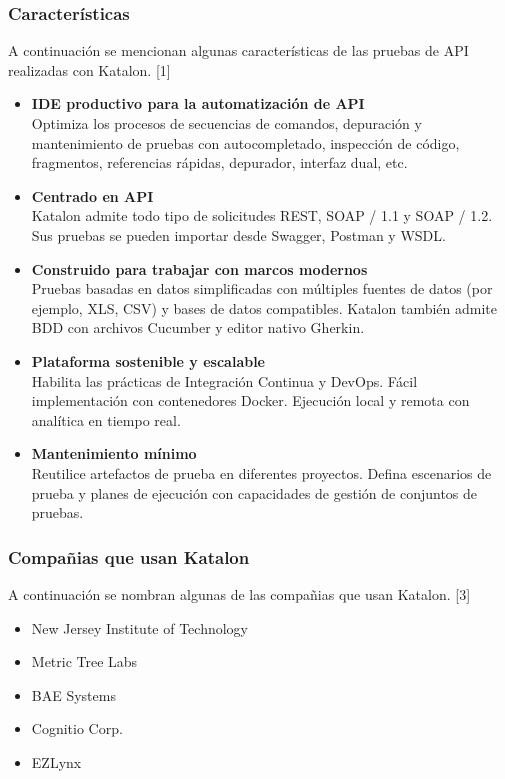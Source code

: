 \documentclass[twoside,twocolumn]{article}
\begin{document}
\subsubsection{Características}

A continuación se mencionan algunas características de las pruebas de API realizadas con Katalon. [1]

\begin{itemize}
  \item \textbf{IDE productivo para la automatización de API} \\
  Optimiza los procesos de secuencias de comandos, depuración y mantenimiento de pruebas con autocompletado, inspección de código, fragmentos, referencias rápidas, depurador, interfaz dual, etc.  
  \item \textbf{Centrado en API} \\
  Katalon admite todo tipo de solicitudes REST, SOAP / 1.1 y SOAP / 1.2. Sus pruebas se pueden importar desde Swagger, Postman y WSDL.
  \item \textbf{Construido para trabajar con marcos modernos} \\
  Pruebas basadas en datos simplificadas con múltiples fuentes de datos (por ejemplo, XLS, CSV) y bases de datos compatibles. Katalon también admite BDD con archivos Cucumber y editor nativo Gherkin.
  \item \textbf{Plataforma sostenible y escalable} \\
  Habilita las prácticas de Integración Continua y DevOps. Fácil implementación con contenedores Docker. Ejecución local y remota con analítica en tiempo real.
  \item \textbf{Mantenimiento mínimo} \\
  Reutilice artefactos de prueba en diferentes proyectos. Defina escenarios de prueba y planes de ejecución con capacidades de gestión de conjuntos de pruebas.
\end{itemize}

\subsubsection{Compañias que usan Katalon}

A continuación se nombran algunas de las compañias que usan Katalon. [3]

\begin{itemize}
  \item New Jersey Institute of Technology
  \item Metric Tree Labs
  \item BAE Systems
  \item Cognitio Corp.
  \item EZLynx
\end{itemize}
\end{document}
